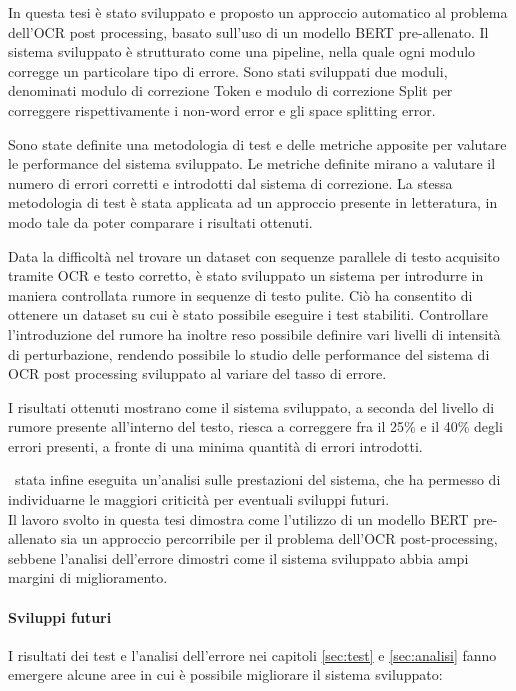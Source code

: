 In questa tesi è stato sviluppato e proposto un approccio automatico al problema dell'OCR post processing, basato sull'uso di un modello BERT pre-allenato. Il sistema sviluppato è strutturato come una pipeline, nella quale ogni modulo corregge un particolare tipo di errore. Sono stati sviluppati due moduli, denominati modulo di correzione Token e modulo di correzione Split per correggere rispettivamente i non-word error e gli space splitting error.

Sono state definite una metodologia di test e delle metriche apposite per valutare le performance del sistema sviluppato. Le metriche definite mirano a valutare il numero di errori corretti e introdotti dal sistema di correzione. La stessa metodologia di test è stata applicata ad un approccio presente in letteratura, in modo tale da poter comparare i risultati ottenuti.

 Data la difficoltà nel trovare un dataset con sequenze parallele di testo acquisito tramite OCR e testo corretto, è stato sviluppato un sistema per introdurre in maniera controllata rumore in sequenze di testo pulite. Ciò ha consentito di ottenere un dataset su cui è stato possibile eseguire i test stabiliti. Controllare l'introduzione del rumore ha inoltre reso possibile definire vari livelli di intensità di perturbazione, rendendo possibile lo studio delle performance del sistema di OCR post processing sviluppato al variare del tasso di errore. 
 
I risultati ottenuti mostrano come il sistema sviluppato, a seconda del livello di rumore presente all'interno del testo, riesca a correggere fra il 25\% e il 40\% degli errori presenti, a fronte di una minima quantità di errori introdotti. 

\E\ stata infine eseguita un'analisi sulle prestazioni del sistema, che ha permesso di individuarne le maggiori criticità per eventuali sviluppi futuri.\\
Il lavoro svolto in questa tesi dimostra come l'utilizzo di un modello BERT pre-allenato sia un approccio percorribile per il problema dell'OCR post-processing, sebbene l'analisi dell'errore dimostri come il sistema sviluppato abbia ampi margini di miglioramento.

\paragraph{Sviluppi futuri} I risultati dei test e l'analisi dell'errore nei capitoli \ref{sec:test} e \ref{sec:analisi} fanno emergere alcune aree in cui è possibile migliorare il sistema sviluppato:

